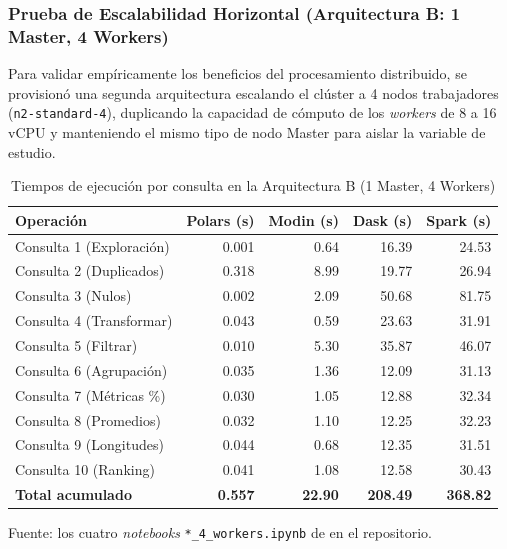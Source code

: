 \subsubsection{Prueba de Escalabilidad Horizontal (Arquitectura B: 1 Master, 4 Workers)}

Para validar empíricamente los beneficios del procesamiento distribuido, se provisionó una segunda arquitectura escalando el clúster a 4 nodos trabajadores (\texttt{n2-standard-4}), duplicando la capacidad de cómputo de los \textit{workers} de 8 a 16 vCPU y manteniendo el mismo tipo de nodo Master para aislar la variable de estudio.

\begin{table}[H]
\centering
\caption{Tiempos de ejecución por consulta en la Arquitectura B (1 Master, 4 Workers)}
\label{tab:tiemposB}
\vspace{0.2cm}
\small
\begin{tabular}{lrrrr}
\toprule
\textbf{Operación} & \textbf{Polars (s)} & \textbf{Modin (s)} & \textbf{Dask (s)} & \textbf{Spark (s)} \\
\midrule
Consulta 1 (Exploración)     &   0.001 &   0.64 &  16.39 &  24.53 \\
Consulta 2 (Duplicados)      &   0.318 &   8.99 &  19.77 &  26.94 \\
Consulta 3 (Nulos)           &   0.002 &   2.09 &  50.68 &  81.75 \\
Consulta 4 (Transformar)     &   0.043 &   0.59 &  23.63 &  31.91 \\
Consulta 5 (Filtrar)         &   0.010 &   5.30 &  35.87 &  46.07 \\
Consulta 6 (Agrupación)      &   0.035 &   1.36 &  12.09 &  31.13 \\
Consulta 7 (Métricas \%)     &   0.030 &   1.05 &  12.88 &  32.34 \\
Consulta 8 (Promedios)       &   0.032 &   1.10 &  12.25 &  32.23 \\
Consulta 9 (Longitudes)      &   0.044 &   0.68 &  12.35 &  31.51 \\
Consulta 10 (Ranking)        &   0.041 &   1.08 &  12.58 &  30.43 \\
\midrule
\textbf{Total acumulado}      & \textbf{0.557} & \textbf{22.90} & \textbf{208.49} & \textbf{368.82} \\
\bottomrule
\end{tabular}
\vspace{0.15cm}

{\footnotesize Fuente: los cuatro \textit{notebooks} \texttt{*\_\bk{}4\_\bk{}workers.\bk{}ipynb} de \nbdir{} en el repositorio.}
\end{table}

